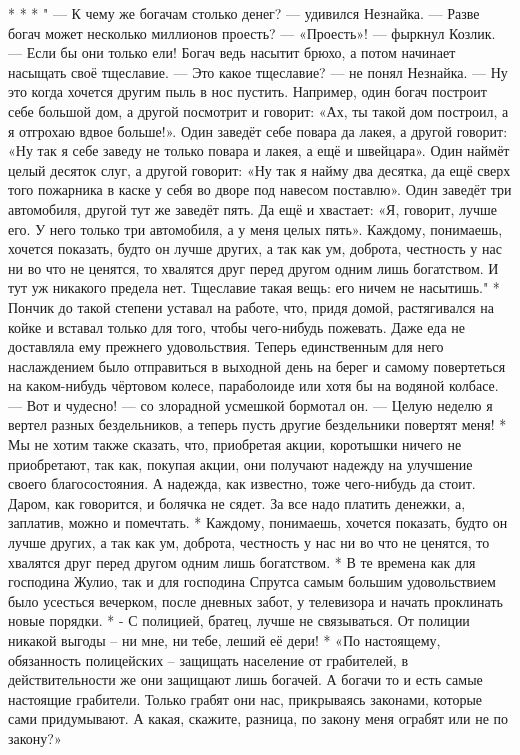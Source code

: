 * * *
" — К чему же богачам столько денег? — удивился Незнайка. — Разве богач
может несколько миллионов проесть? — «Проесть»! — фыркнул Козлик. — Если бы
они только ели! Богач ведь насытит брюхо, а потом начинает насыщать своё
тщеславие. — Это какое тщеславие? — не понял Незнайка. — Ну это когда
хочется другим пыль в нос пустить. Например, один богач построит себе
большой дом, а другой посмотрит и говорит: «Ах, ты такой дом построил, а я
отгрохаю вдвое больше!». Один заведёт себе повара да лакея, а другой
говорит: «Ну так я себе заведу не только повара и лакея, а ещё и швейцара».
Один наймёт целый десяток слуг, а другой говорит: «Ну так я найму два
десятка, да ещё сверх того пожарника в каске у себя во дворе под навесом
поставлю». Один заведёт три автомобиля, другой тут же заведёт пять. Да ещё и
хвастает: «Я, говорит, лучше его. У него только три автомобиля, а у меня
целых пять». Каждому, понимаешь, хочется показать, будто он лучше других, а
так как ум, доброта, честность у нас ни во что не ценятся, то хвалятся друг
перед другом одним лишь богатством. И тут уж никакого предела нет. Тщеславие
такая вещь: его ничем не насытишь."
* 
Пончик до такой степени уставал на работе, что, придя домой, растягивался на койке и вставал только для того, чтобы чего-нибудь пожевать. Даже еда не доставляла ему прежнего удовольствия. Теперь единственным для него наслаждением было отправиться в выходной день на берег и самому повертеться на каком-нибудь чёртовом колесе, параболоиде или хотя бы на водяной колбасе. — Вот и чудесно! — со злорадной усмешкой бормотал он. — Целую неделю я вертел разных бездельников, а теперь пусть другие бездельники повертят меня! 
*
Мы не хотим также сказать, что, приобретая акции, коротышки ничего не приобретают, так как, покупая акции, они получают надежду на улучшение своего благосостояния. А надежда, как известно, тоже чего-нибудь да стоит. Даром, как говорится, и болячка не сядет. За все надо платить денежки, а, заплатив, можно и помечтать. 
*
Каждому, понимаешь, хочется показать, будто он лучше других, а так как ум, доброта, честность у нас ни во что не ценятся, то хвалятся друг перед другом одним лишь богатством. 
*
В те времена как для господина Жулио, так и для господина Спрутса самым большим удовольствием было усесться вечерком, после дневных забот, у телевизора и начать проклинать новые порядки. 
*
- С полицией, братец, лучше не связываться. От полиции никакой выгоды – ни мне, ни тебе, леший её дери! 
*
«По настоящему, обязанность полицейских – защищать население от грабителей, в действительности же они защищают лишь богачей. А богачи то и есть самые настоящие грабители. Только грабят они нас, прикрываясь законами, которые сами придумывают. А какая, скажите, разница, по закону меня ограбят или не по закону?» 
